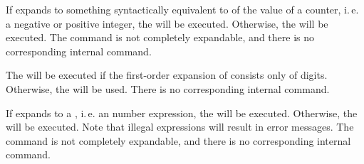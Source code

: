 \begin{Declaration}
\end{Declaration}
If
 expands to something syntactically equivalent to of the
value of a counter, i.\,e. a negative or positive integer, the  will be executed. Otherwise, the  will be
executed. The command is not completely expandable, and there is no
corresponding internal command.%
\EndIndexGroup


\begin{Declaration}
\end{Declaration}
The  will be executed if
the first-order expansion of  consists only of
digits. Otherwise, the  will be used. There is no
corresponding internal command.
%
\EndIndexGroup


\begin{Declaration}
\end{Declaration}
If
 expands to a , i.\,e. an \eTeX{} number
expression, the  will be executed. Otherwise, the  will be executed.  Note that illegal expressions
will result in error messages. The command is not completely expandable, and
there is no corresponding internal command.%
\EndIndexGroup


